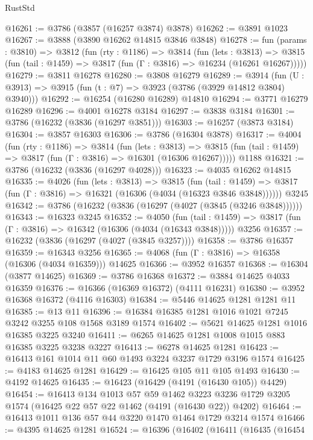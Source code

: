 \begin{lexlean}{RustStd}
\begin{coremodule}
@16261 := @3786 (@3857 (@16257 @3874) @3878)
@16262 := @3891 @1023
@16267 := @3888 (@3890 @16262 @14815 @3846 @3848)
@16278 := fun (params : @3810) =>
  @3812
    (fun (rty : @1186) =>
    @3814
      (fun (lets : @3813) =>
      @3815 (fun (tail : @1459) => @3817 (fun (Γ : @3816) => @16234 (@16261 @16267)))))
@16279 := @3811 @16278
@16280 := @3808 @16279
@16289 := @3914
    (fun (U : @3913) => @3915 (fun (t : @7) => @3923 (@3786 (@3929 @14812 @3804) @3940)))
@16292 := @16254 (@16280 @16289) @14810
@16294 := @3771 @16279 @16289
@16296 := @4001 @16278 @3184
@16297 := @3838 @3184
@16301 := @3786 (@16232 (@3836 (@16297 @3851)))
@16303 := @16257 (@3873 @3184)
@16304 := @3857 @16303
@16306 := @3786 (@16304 @3878)
@16317 := @4004
    (fun (rty : @1186) =>
    @3814
      (fun (lets : @3813) =>
      @3815 (fun (tail : @1459) => @3817 (fun (Γ : @3816) => @16301 (@16306 @16267)))))
    @1188
@16321 := @3786 (@16232 (@3836 (@16297 @4028)))
@16323 := @4035 @16262 @14815
@16335 := @4026
    (fun (lets : @3813) =>
    @3815
      (fun (tail : @1459) =>
      @3817 (fun (Γ : @3816) => @16321 (@16306 (@4034 (@16323 @3846 @3848))))))
    @3245
@16342 := @3786 (@16232 (@3836 (@16297 (@4027 (@3845 (@3246 @3848))))))
@16343 := @16323 @3245
@16352 := @4050
    (fun (tail : @1459) => @3817 (fun (Γ : @3816) => @16342 (@16306 (@4034 (@16343 @3848)))))
    @3256
@16357 := @16232 (@3836 (@16297 (@4027 (@3845 @3257))))
@16358 := @3786 @16357
@16359 := @16343 @3256
@16365 := @4068 (fun (Γ : @3816) => @16358 (@16306 (@4034 @16359))) @14625
@16366 := @3952 @16357
@16368 := @16304 (@3877 @14625)
@16369 := @3786 @16368
@16372 := @3884 @14625 @4033 @16359
@16376 := @16366 (@16369 @16372) (@4111 @16231)
@16380 := @3952 @16368 @16372 (@4116 @16303)
@16384 := @5446 @14625 @1281 @1281 @11
@16385 := @13 @11
@16396 := @16384 @16385 @1281 @1016 @1021 @7245 @3242 @3255 @108 @1568 @3189 @1574
@16402 := @5621 @14625 @1281 @1016 @16385 @3225 @3240
@16411 := @6265 @14625 @1281 @1008 @1015 @883 @16385 @3225 @3238 @3227
@16413 := @6278 @14625 @1281
@16423 := @16413 @161 @1014 @11 @60 @1493 @3224 @3237 @1729 @3196 @1574
@16425 := @4183 @14625 @1281
@16429 := @16425 @105 @11 @105 @1493
@16430 := @4192 @14625
@16435 := @16423 (@16429 (@4191 (@16430 @105)) @4429)
@16454 := @16413
    @134
    @1013
    @57
    @59
    @1462
    @3223
    @3236
    @1729
    @3205
    @1574
    (@16425 @22 @57 @22 @1462 (@4191 (@16430 @22)) @4202)
@16464 := @16413 @1011 @136 @57 @44 @3220 @1470 @1464 @1729 @3214 @1574
@16466 := @4395 @14625 @1281
@16524 := @16396
    (@16402
      (@16411
        (@16435
          (@16454

\end{coremodule}
\end{lexlean}
